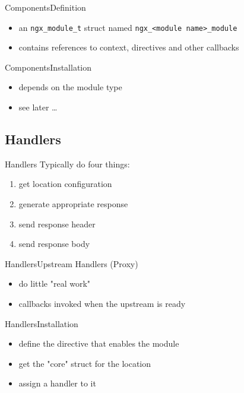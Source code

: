 \documentclass{beamer}
\begin{document}
\begin{frame}[fragile]{Components}{Definition}
 \begin{itemize}
  \item an \verb|ngx_module_t| struct named \verb|ngx_<module name>_module|
  \item contains references to context, directives and other callbacks
 \end{itemize}
\end{frame}

\begin{frame}{Components}{Installation}
\begin{itemize}
 \item depends on the module type 
 \item see later \ldots
\end{itemize}
\end{frame}

\subsection{Handlers}

\begin{frame}{Handlers}
Typically do four things:
\begin{enumerate}
 \item get location configuration
 \item generate appropriate response
 \item send response header
 \item send response body
\end{enumerate}
\end{frame}

\begin{frame}{Handlers}{Upstream Handlers (Proxy)}
\begin{itemize}
 \item do little "real work"
 \item callbacks invoked when the upstream is ready
\end{itemize}
\end{frame}

\begin{frame}{Handlers}{Installation}
\begin{itemize}
 \item define the directive that enables the module
 \item get the "core" struct for the location
 \item assign a handler to it
\end{itemize}
\end{frame}
\end{document}
